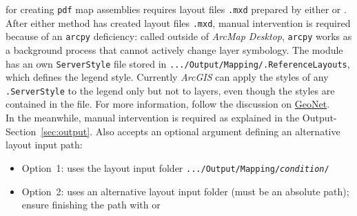  for creating \texttt{pdf} map assemblies requires layout files \texttt{.mxd} prepared by either  or . After either method has created layout files \texttt{.mxd}, manual intervention is required because of an \texttt{arcpy} deficiency: called outside of \textit{ArcMap Desktop}, \texttt{arcpy} works as a background process that cannot actively change layer symbology. The module has an own \texttt{ServerStyle} file stored in \texttt{.../Output/Mapping/.ReferenceLayouts}, which defines the legend style. Currently \textit{ArcGIS} can apply the styles of any \texttt{.ServerStyle} to the legend only but not to layers, even though the styles are contained in the file. For more information, follow the discussion on \href{https://community.esri.com/thread/210442-how-do-i-apply-arcpymappingupdatelayer-to-a-mapdocument-in-a-background-process}{GeoNet}.\\

In the meanwhile, manual intervention is required as explained in the Output-Section~\ref{sec:output}. Also  accepts an optional argument defining an alternative layout input path:
\begin{itemize}
	\item Option~1:  uses the layout input folder \texttt{.../Output/Mapping/\textit{condition}/} 
	\item Option~2:  uses an alternative layout input folder (must be an absolute path); ensure finishing the path with  or 
\end{itemize}


